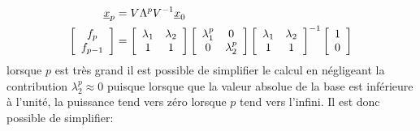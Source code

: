 \begin{align}
	\underline{x}_{p} &= V \Lambda^p V^{-1} \underline{x}_{0} \\
	\left[ \begin{array}{c}
			   f_p \\ f_{p-1}
	\end{array} \right]
	&=
	\left[ \begin{array}{c c }
			   \lambda_1 & \lambda_2 \\
			   1         & 1 \\
	\end{array} \right]
	\left[ \begin{array}{c c }
			   \lambda_1^p & 0 \\
			   0         & \lambda_2^p \\
	\end{array} \right]
	\left[ \begin{array}{c c }
			   \lambda_1 & \lambda_2 \\
			   1         & 1 \\
	\end{array} \right]^{-1}
	\left[ \begin{array}{c}
			   1 \\ 0
	\end{array} \right]
\end{align}
lorsque $p$ est très grand il est possible de simplifier le calcul en négligeant la contribution $\lambda_2^p \approx 0$ puisque lorsque que la valeur absolue de la base est inférieure à l'unité, la puissance tend vers zéro lorsque $p$ tend vers l'infini. Il est donc possible de simplifier:
